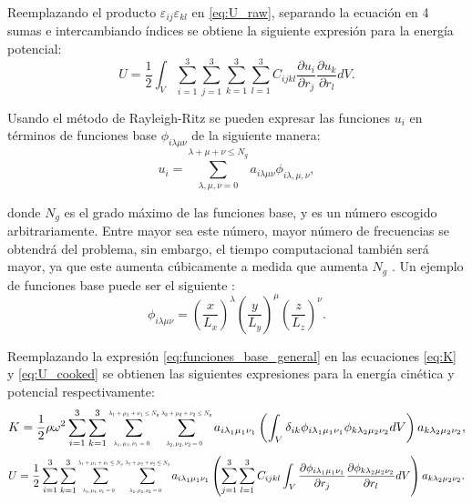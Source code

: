 \documentclass[12pt]{article}
\newcommand*{\Scale}[2][4]{\scalebox{#1}{$#2$}}%
\begin{document}
Reemplazando el producto $\varepsilon_{ij}\varepsilon_{kl}$ en \ref{eq:U_raw}, separando la ecuación en 4 sumas e intercambiando índices se obtiene la siguiente expresión para la energía potencial:
\begin{equation}
	U = \frac{1}{2} \int_{V}{\sum_{i=1}^{3}\sum_{j=1}^{3}\sum_{k=1}^{3}\sum_{l=1}^{3}{C_{ijkl}\frac{\partial u_i}{\partial r_j} \frac{\partial u_k}{\partial r_l}}dV}.
	\label{eq:U_cooked}
\end{equation}

Usando el método de Rayleigh-Ritz se pueden expresar las funciones $u_i$ en términos de funciones base $\phi_{i \lambda \mu \nu}$ de la siguiente manera: 
\begin{equation}
	u_i = \sum_{\lambda,\mu,\nu=0}^{\lambda + \mu + \nu \le N_g}{a_{i\lambda\mu\nu} \phi_{i\lambda,\mu,\nu}},
	\label{eq:funciones_base_general}
\end{equation}

donde $N_g$ es el grado máximo de las funciones base, y es un número escogido arbitrariamente. Entre mayor sea este número, mayor número de frecuencias se obtendrá del problema, sin embargo, el tiempo computacional también será mayor, ya que este aumenta cúbicamente a medida que aumenta $N_g$ \cite{Leisure_1997}. Un ejemplo de funciones base puede ser el siguiente \cite{Demarest}:
\begin{equation}
    \phi_{i \lambda \mu \nu} = \left(\frac{x}{L_x} \right)^{\lambda} \left(\frac{y}{L_y} \right)^{\mu} \left(\frac{z}{L_z} \right)^{\nu}.
	\label{eq:funciones_base_potencias}
\end{equation}

Reemplazando la expresión \ref{eq:funciones_base_general} en las ecuaciones \ref{eq:K} y \ref{eq:U_cooked} se obtienen las siguientes expresiones para la energía cinética y potencial respectivamente:
\begin{equation}
	K = \frac{1}{2} \rho \omega^2 \sum_{i=1}^{3}\sum_{k=1}^{3}\sum_{\Scale[0.5]{\lambda_1,\mu_1,\nu_1 = 0}}^{\Scale[0.5]{\lambda_1 + \mu_1 + \nu_1 \le N_g}} \sum_{\Scale[0.5]{\lambda_2,\mu_2,\nu_2 = 0}}^{\Scale[0.5]{\lambda_2 + \mu_2 + \nu_2 \le N_g}} {a_{i \lambda_1 \mu_1 \nu_1} \left(\int_{V} {\delta_{ik} \phi_{i \lambda_1 \mu_1 \nu_1} \phi_{k \lambda_2 \mu_2 \nu_2} dV} \right) a_{k \lambda_2 \mu_2 \nu_2}},
	\label{eq:K_final}
\end{equation}
\begin{equation}
	\centering
	U = \frac{1}{2} \sum_{i=1}^{3}\sum_{k=1}^{3}\sum_{\Scale[0.5]{\lambda_1,\mu_1,\nu_1 = 0}}^{\Scale[0.5]{\lambda_1 + \mu_1 + \nu_1 \le N_g}} \sum_{\Scale[0.5]{\lambda_2,\mu_2,\nu_2 = 0}}^{\Scale[0.5]{\lambda_2 + \mu_2 + \nu_2 \le N_g}} {a_{i \lambda_1 \mu_1 \nu_1}\left(\sum_{j=1}^{3}\sum_{l=1}^{3} C_{ijkl}\int_{V} { \frac{\partial \phi_{i \lambda_1 \mu_1 \nu_1}}{\partial r_j} \frac{\partial \phi_{k \lambda_2 \mu_2 \nu_2}}{\partial r_l} dV} \right) a_{k \lambda_2 \mu_2 \nu_2}}.
	\label{eq:U_final}
\end{equation}
\end{document}
